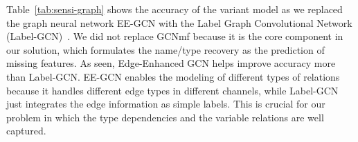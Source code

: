 Table~\ref{tab:sensi-graph} shows the accuracy of the variant model
as we replaced the graph neural network EE-GCN with the Label Graph
Convolutional Network (Label-GCN)~\cite{label-gcn}. We did not replace
GCNmf because it is the core component in our solution, which
formulates the name/type recovery as the prediction of missing
features. As seen, Edge-Enhanced GCN helps improve accuracy more than
Label-GCN. EE-GCN enables the modeling of different types of relations
because it handles different edge types in different channels, while
Label-GCN just integrates the edge information as simple labels.
This is crucial for our problem in which the type dependencies
and the variable relations are well captured.





